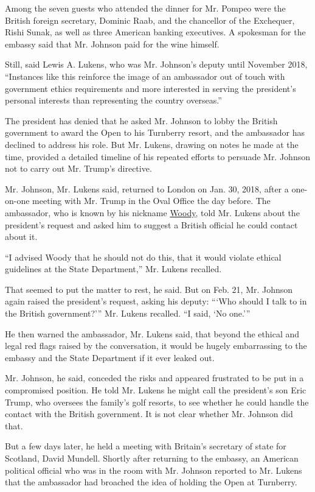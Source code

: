 Among the seven guests who attended the dinner for Mr. Pompeo were the
British foreign secretary, Dominic Raab, and the chancellor of the
Exchequer, Rishi Sunak, as well as three American banking executives. A
spokesman for the embassy said that Mr. Johnson paid for the wine
himself.

Still, said Lewis A. Lukens, who was Mr. Johnson's deputy until November
2018, ``Instances like this reinforce the image of an ambassador out of
touch with government ethics requirements and more interested in serving
the president's personal interests than representing the country
overseas.''

The president has denied that he asked Mr. Johnson to lobby the British
government to award the Open to his Turnberry resort, and the ambassador
has declined to address his role. But Mr. Lukens, drawing on notes he
made at the time, provided a detailed timeline of his repeated efforts
to persuade Mr. Johnson not to carry out Mr. Trump's directive.

Mr. Johnson, Mr. Lukens said, returned to London on Jan. 30, 2018, after
a one-on-one meeting with Mr. Trump in the Oval Office the day before.
The ambassador, who is known by his nickname
\href{https://www.nytimes.com/2020/07/25/sports/football/woody-johnson-trump-jets.html}{Woody},
told Mr. Lukens about the president's request and asked him to suggest a
British official he could contact about it.

``I advised Woody that he should not do this, that it would violate
ethical guidelines at the State Department,'' Mr. Lukens recalled.

That seemed to put the matter to rest, he said. But on Feb. 21, Mr.
Johnson again raised the president's request, asking his deputy: ```Who
should I talk to in the British government?''' Mr. Lukens recalled. ``I
said, `No one.'''

He then warned the ambassador, Mr. Lukens said, that beyond the ethical
and legal red flags raised by the conversation, it would be hugely
embarrassing to the embassy and the State Department if it ever leaked
out.

Mr. Johnson, he said, conceded the risks and appeared frustrated to be
put in a compromised position. He told Mr. Lukens he might call the
president's son Eric Trump, who oversees the family's golf resorts, to
see whether he could handle the contact with the British government. It
is not clear whether Mr. Johnson did that.

But a few days later, he held a meeting with Britain's secretary of
state for Scotland, David Mundell. Shortly after returning to the
embassy, an American political official who was in the room with Mr.
Johnson reported to Mr. Lukens that the ambassador had broached the idea
of holding the Open at Turnberry.

